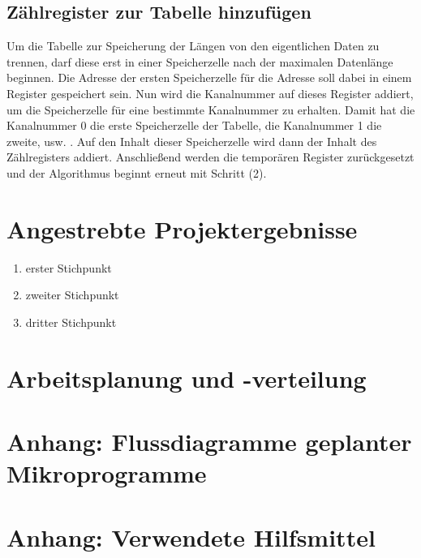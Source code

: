 \documentclass[12pt,titlepage,german,a4]{article}
\begin{document}
    \subsection{Z{\"a}hlregister zur Tabelle hinzuf{\"u}gen}
    Um die Tabelle zur Speicherung der L{\"a}ngen von den eigentlichen Daten zu trennen, darf diese erst in einer Speicherzelle nach der maximalen Datenl{\"a}nge beginnen. Die Adresse der ersten Speicherzelle f{\"u}r die Adresse soll dabei in einem Register gespeichert sein. Nun wird die Kanalnummer auf dieses Register addiert, um die Speicherzelle f{\"u}r eine bestimmte Kanalnummer zu erhalten. Damit hat die Kanalnummer 0 die erste Speicherzelle der Tabelle, die Kanalnummer 1 die zweite, usw. . Auf den Inhalt dieser Speicherzelle wird dann der Inhalt des Z{\"a}hlregisters addiert. Anschlie{\ss}end werden die tempor{\"a}ren Register zur{\"u}ckgesetzt und der Algorithmus beginnt erneut mit Schritt (2).



    \section{Angestrebte Projektergebnisse}
        \begin{enumerate}
            \item erster Stichpunkt
            \item zweiter Stichpunkt
            \item dritter Stichpunkt
        \end{enumerate}
    \section{Arbeitsplanung und -verteilung}

    \section{Anhang: Flussdiagramme geplanter Mikroprogramme}

    \section{Anhang: Verwendete Hilfsmittel}
\end{document}
